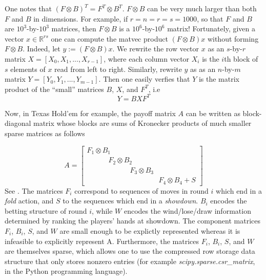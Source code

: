 \documentclass[envcountsame]{llncs} %
\begin{document}
One notes that $(F \otimes B)^T = F^T \otimes B^T$.
$F \otimes B$ can be very much larger than both $F$ and $B$ in dimensions. For example, if $r = n = r = s = 1000$, so that $F$ and $B$ are $10^3$-by-$10^3$ matrices, then $F \otimes B$ is a $10^6$-by-$10^6$ matrix! Fortunately, given a vector $x \in \mathbb{R}^{rs}$ one can compute the matvec product $(F \otimes B)x$ without forming $F \otimes B$. Indeed, let $y := (F \otimes B)x$. We rewrite the row vector $x$ as an $s$-by-$r$ matrix $X = [X_0, X_1, ..., X_{r-1}]$, where each column vector $X_i$ is the $i$th block of $s$ elements of $x$ read from left to right. Similarly, rewrite $y$ as as an $n$-by-$m$ matrix $Y = [Y_0, Y_1, ..., Y_{m-1}]$. Then one easily verfies that $Y$ is the matrix product of the ``small'' matrices $B$, $X$, and $F^T$, i.e
\begin{equation}
  \label{eq:kron_matvec}
  Y = BXF^T
\end{equation}

Now, in Texas Hold'em for example, the payoff matrix $A$ can be written as block-diagonal matrix whose blocks are sums of Kronecker products of much smaller sparse matrices as follows

\begin{equation}
  A = \begin{bmatrix}F_1 \otimes B_1\hspace{10em}\\\hspace{3em}F_2 \otimes B_2\hspace{7em}\\\hspace{6em}F_3 \otimes B_3\hspace{4em}\\\hspace{10em}F_4 \otimes B_4 + S \end{bmatrix}
\label{eq:factor_A}
\end{equation}
See \cite{hoda2010smoothing}. The matrices $F_i$ correspond to sequences of moves in round $i$ which end in a \textit{fold} action, and $S$ to the sequences which end in a \textit{showdown}. $B_i$ encodes the betting structure of round $i$, while $W$ encodes the wind/lose/draw information determined by ranking the players' hands at showdown. The component matrices $F_i$, $B_i$, $S$, and $W$ are small enough to be explictly represented whereas it is infeasible to explicitly represent A. Furthermore, the matrices $F_i$, $B_i$,
$S$, and $W$ are themselves sparse, which allows one to use the compressed row storage data structure that only stores nonzero entries (for example \textit{scipy.sparse.csr\_matrix}, in the Python programming language).
\end{document}
